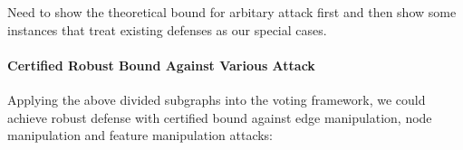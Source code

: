 {\color{red} Need to show the theoretical bound for arbitary attack first and then show some instances that treat existing defenses as our special cases.}

\paragraph{Certified Robust Bound Against Various Attack}
Applying the above divided subgraphs into the voting framework, we could achieve robust defense with certified bound against edge manipulation, node manipulation and feature manipulation attacks:






